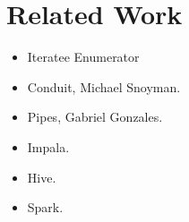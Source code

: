 \clearpage{}
\section{Related Work}

\begin{itemize}
\item Iteratee Enumerator
\item Conduit, Michael Snoyman.
\item Pipes, Gabriel Gonzales.
\item Impala.
\item Hive.
\item Spark.
\end{itemize}






